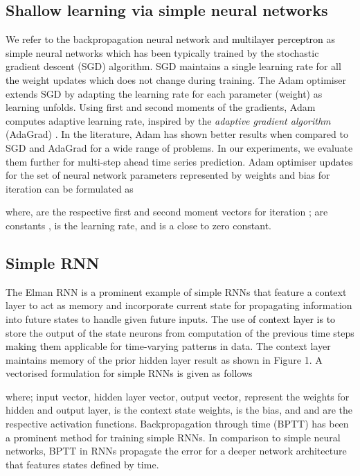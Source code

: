 \documentclass{ieeeaccess}
\begin{document}
 \subsection{Shallow learning via simple neural networks }
    
We refer to \textcolor{black}{the} backpropagation neural network and \textcolor{black}{multilayer perceptron}  as simple neural networks which has been typically trained by the stochastic gradient descent (SGD) algorithm. SGD maintains a single learning rate for all \textcolor{black}{the} weight updates which does not change during training. 
 The Adam optimiser \cite{kingma2014adam} extends  SGD by adapting the learning rate  for each parameter (weight)  as learning unfolds. Using first and second moments of the gradients, Adam computes adaptive learning rate, inspired by the \textit{adaptive gradient algorithm} (AdaGrad) \cite{duchi2011adaptive}.  In the literature, Adam has shown better results when compared to SGD and AdaGrad for a wide range of problems. In our experiments, we evaluate them further for multi-step ahead time series prediction.  Adam \textcolor{black}{optimiser updates} for the set of neural network parameters represented  by weights  and bias  for iteration    can be formulated as



 where,  are the respective first  and second  moment vectors for iteration ;  are constants ,  is the learning rate, and  is a close to zero constant. 

  
 
 \subsection{Simple RNN}
 
  The Elman RNN \cite{Elman_1990} is a prominent example of simple RNNs that  feature  a  context layer to act as memory  and incorporate current state for propagating information into future states to handle given future inputs. The   use \textcolor{black}{of context layer is to} store the output of the state neurons from computation of the previous time steps \textcolor{black}{making} them applicable for time-varying patterns in  data.  The context layer   maintains memory of the prior hidden layer result as shown in Figure 1. A vectorised formulation for simple RNNs is given as follows
 
  
 
 
 
 \noindent  where;  input vector,  hidden layer vector,  output vector,  represent the weights for hidden  and output layer,   is the context state weights,     is the bias,  and    and    are the respective activation functions. Backpropagation through time (BPTT) \cite{Werbos_1990} has been \textcolor{black}{a} prominent method for training simple RNNs. In comparison to simple neural networks, BPTT in RNNs propagate the error for a deeper network architecture that features states defined by time.  
  
\end{document}
